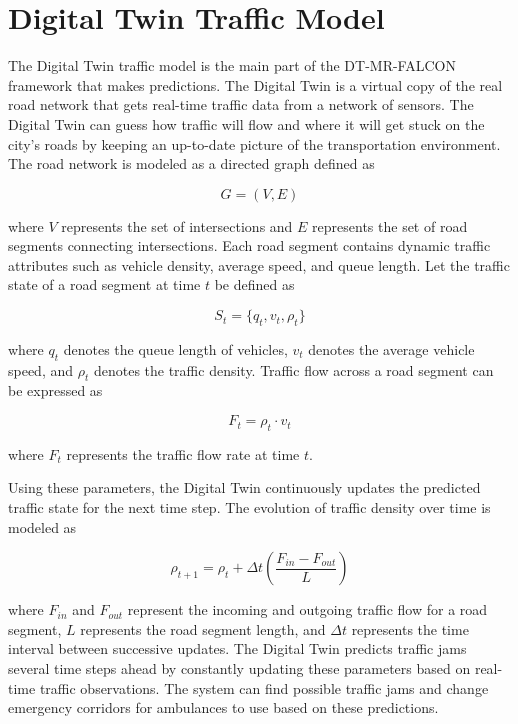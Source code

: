 \documentclass[conference]{IEEEtran}
\begin{document}
\section{Digital Twin Traffic Model}
The Digital Twin traffic model is the main part of the DT-MR-FALCON framework that makes predictions. The Digital Twin is a virtual copy of the real road network that gets real-time traffic data from a network of sensors. The Digital Twin can guess how traffic will flow and where it will get stuck on the city's roads by keeping an up-to-date picture of the transportation environment.
The road network is modeled as a directed graph defined as

\begin{equation}
G = (V, E)
\end{equation}

where $V$ represents the set of intersections and $E$ represents the set of road segments connecting intersections. Each road segment contains dynamic traffic attributes such as vehicle density, average speed, and queue length.
Let the traffic state of a road segment at time $t$ be defined as

\begin{equation}
S_t = \{q_t, v_t, \rho_t\}
\end{equation}

where $q_t$ denotes the queue length of vehicles, $v_t$ denotes the average vehicle speed, and $\rho_t$ denotes the traffic density.
Traffic flow across a road segment can be expressed as

\begin{equation}
F_t = \rho_t \cdot v_t
\end{equation}

where $F_t$ represents the traffic flow rate at time $t$.

Using these parameters, the Digital Twin continuously updates the predicted traffic state for the next time step. The evolution of traffic density over time is modeled as

\begin{equation}
\rho_{t+1} = \rho_t + \Delta t \left(\frac{F_{in} - F_{out}}{L}\right)
\end{equation}

where $F_{in}$ and $F_{out}$ represent the incoming and outgoing traffic flow for a road segment, $L$ represents the road segment length, and $\Delta t$ represents the time interval between successive updates.
The Digital Twin predicts traffic jams several time steps ahead by constantly updating these parameters based on real-time traffic observations. The system can find possible traffic jams and change emergency corridors for ambulances to use based on these predictions.
\end{document}
